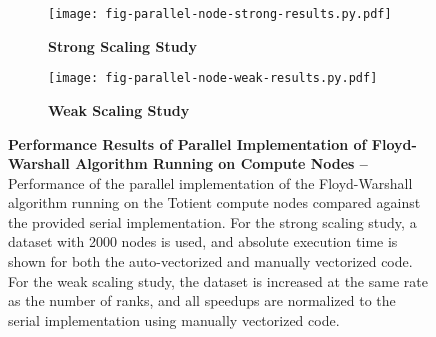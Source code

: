 
\begin{figure}[h]

  \begin{minipage}[t]{0.48\tw}
  \begin{subfigure}{\tw}

  \centering
  \texttt{[image: fig-parallel-node-strong-results.py.pdf]}
  \caption{\textbf{Strong Scaling Study}}
  \label{fig-parallel-node-strong-results}

  \end{subfigure}
  \end{minipage}%
  \hfill%
  \begin{minipage}[t]{0.48\tw}
  \begin{subfigure}{\tw}

  \centering
  \texttt{[image: fig-parallel-node-weak-results.py.pdf]}
  \caption{\textbf{Weak Scaling Study}}
  \label{fig-parallel-node-weak-results}

  \end{subfigure}
  \end{minipage}%

  \caption{\textbf{Performance Results of Parallel Implementation of
      Floyd-Warshall Algorithm Running on Compute Nodes --} Performance
    of the parallel implementation of the Floyd-Warshall algorithm
    running on the Totient compute nodes compared against the provided
    serial implementation. For the strong scaling study, a dataset with
    2000 nodes is used, and absolute execution time is shown for both the
    auto-vectorized and manually vectorized code. For the weak scaling
    study, the dataset is increased at the same rate as the number of
    ranks, and all speedups are normalized to the serial
    implementation using manually vectorized code. }

  \label{fig-parallel-node-results}

\end{figure}
